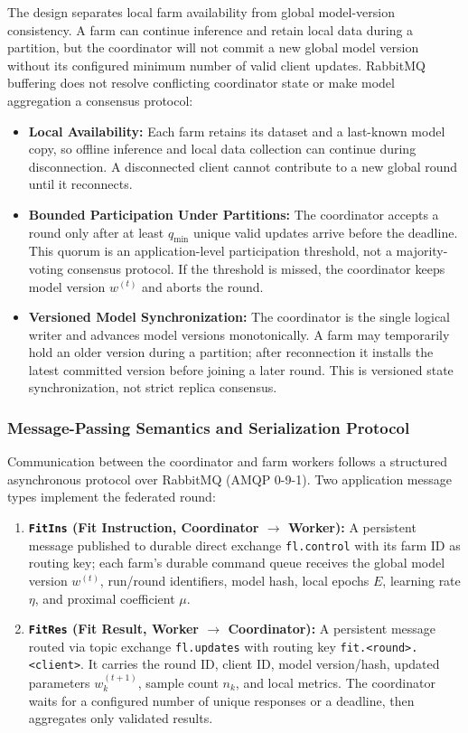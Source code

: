 \documentclass[applsci,article,submit,oneauthor,pdftex]{Definitions/mdpi}
\begin{document}
The design separates local farm availability from global model-version consistency. A farm can continue inference and retain local data during a partition, but the coordinator will not commit a new global model version without its configured minimum number of valid client updates. RabbitMQ buffering does not resolve conflicting coordinator state or make model aggregation a consensus protocol:
\begin{itemize}[leftmargin=*]
    \item \textbf{Local Availability:} Each farm retains its dataset and a last-known model copy, so offline inference and local data collection can continue during disconnection. A disconnected client cannot contribute to a new global round until it reconnects.
    \item \textbf{Bounded Participation Under Partitions:} The coordinator accepts a round only after at least $q_{\min}$ unique valid updates arrive before the deadline. This quorum is an application-level participation threshold, not a majority-voting consensus protocol. If the threshold is missed, the coordinator keeps model version $w^{(t)}$ and aborts the round.
    \item \textbf{Versioned Model Synchronization:} The coordinator is the single logical writer and advances model versions monotonically. A farm may temporarily hold an older version during a partition; after reconnection it installs the latest committed version before joining a later round. This is versioned state synchronization, not strict replica consensus.
\end{itemize}

\subsubsection{Message-Passing Semantics and Serialization Protocol}
Communication between the coordinator and farm workers follows a structured asynchronous protocol over RabbitMQ (AMQP 0-9-1). Two application message types implement the federated round:
\begin{enumerate}[leftmargin=*]
    \item \textbf{\texttt{FitIns} (Fit Instruction, Coordinator $\to$ Worker):} A persistent message published to durable direct exchange \texttt{fl.control} with its farm ID as routing key; each farm's durable command queue receives the global model version $w^{(t)}$, run/round identifiers, model hash, local epochs $E$, learning rate $\eta$, and proximal coefficient $\mu$.
    \item \textbf{\texttt{FitRes} (Fit Result, Worker $\to$ Coordinator):} A persistent message routed via topic exchange \texttt{fl.updates} with routing key \texttt{fit.<round>.<client>}. It carries the round ID, client ID, model version/hash, updated parameters $w_k^{(t+1)}$, sample count $n_k$, and local metrics. The coordinator waits for a configured number of unique responses or a deadline, then aggregates only validated results.
\end{enumerate}
\end{document}
